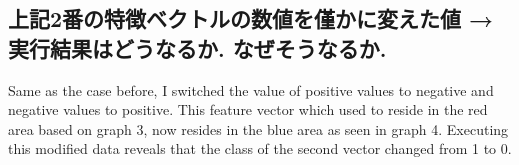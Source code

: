 \documentclass[a4j, twocolumn]{jarticle}
\begin{document}
\subsection{上記2番の特徴ベクトルの数値を僅かに変えた値 →実行結果はどうなるか. なぜそうなるか.}
\begin{table}[h]
  \caption{上記1番特徴ベクトりの数値を変化前後の結果}\label{second-data-modification}
  \centering
\end{table}
Same as the case before, I switched the value of positive values to negative and negative values to positive. This feature vector which used to reside in the red area based on graph 3, now resides in the blue area as seen in graph 4. Executing this modified data reveals that the class of the second vector changed from 1 to 0.\\
\end{document}
